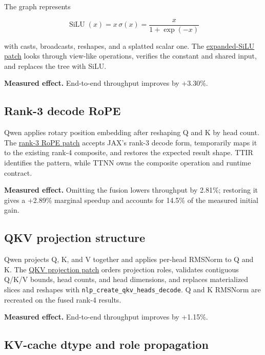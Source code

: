 \documentclass[
  10pt,
  american,
  10pt,
  letterpaper]{article}
\begin{document}
The graph represents

\[
\operatorname{SiLU}(x)=x\,\sigma(x)=\frac{x}{1+\exp(-x)}
\]

with casts, broadcasts, reshapes, and a splatted scalar one. The
\href{../../third_party/tt_xla/tt_mlir_fuse_expanded_silu.patch}{expanded-SiLU
patch} looks through view-like operations, verifies the constant and
shared input, and replaces the tree with SiLU.

\textbf{Measured effect.} End-to-end throughput improves by +3.30\%.

\hypertarget{rank-3-decode-rope}{%
\subsection{Rank-3 decode RoPE}\label{rank-3-decode-rope}}

Qwen applies rotary position embedding after reshaping Q and K by head
count. The
\href{../../third_party/tt_xla/tt_mlir_fuse_rank3_rope_decode.patch}{rank-3
RoPE patch} accepts JAX's rank-3 decode form, temporarily maps it to the
existing rank-4 composite, and restores the expected result shape. TTIR
identifies the pattern, while TTNN owns the composite operation and
runtime contract.

\textbf{Measured effect.} Omitting the fusion lowers throughput by
2.81\%; restoring it gives a +2.89\% marginal speedup and accounts for
14.5\% of the measured initial gain.

\hypertarget{qkv-projection-structure}{%
\subsection{QKV projection structure}\label{qkv-projection-structure}}

Qwen projects Q, K, and V together and applies per-head RMSNorm to Q and
K. The
\href{../../third_party/tt_xla/tt_mlir_qwen_decode_qkv_projection_fusion.patch}{QKV
projection patch} orders projection roles, validates contiguous Q/K/V
bounds, head counts, and head dimensions, and replaces materialized
slices and reshapes with \texttt{nlp\_create\_qkv\_heads\_decode}. Q and
K RMSNorm are recreated on the fused rank-4 results.

\textbf{Measured effect.} End-to-end throughput improves by +1.15\%.

\hypertarget{kv-cache-dtype-and-role-propagation}{%
\subsection{KV-cache dtype and role
propagation}\label{kv-cache-dtype-and-role-propagation}}
\end{document}
